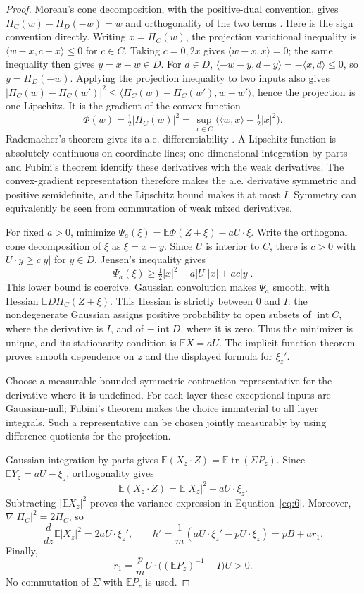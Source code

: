 \begin{proof}
Moreau's cone decomposition, with the positive-dual convention, gives
\(\Pi_C(w)-\Pi_D(-w)=w\) and orthogonality of the two terms
\cite{Moreau1962,Soltan2019}. Here is the sign convention directly.
Writing $x=\Pi_C(w)$, the projection variational inequality is
$\langle w-x,c-x\rangle\le0$ for $c\in C$. Taking $c=0,2x$ gives
$\langle w-x,x\rangle=0$; the same inequality then gives $y=x-w\in D$.
For $d\in D$, $\langle-w-y,d-y\rangle=-\langle x,d\rangle\le0$,
so $y=\Pi_D(-w)$. Applying the projection inequality to two inputs
also gives
$|\Pi_C(w)-\Pi_C(w')|^2\le\langle\Pi_C(w)-\Pi_C(w'),w-w'\rangle$,
hence the projection is one-Lipschitz. It is the gradient of the convex function
\[
\Phi(w)=\tfrac12|\Pi_C(w)|^2
=\sup_{x\in C}\bigl(\langle w,x\rangle-\tfrac12|x|^2\bigr).
\]
Rademacher's theorem gives its a.e. differentiability
\cite{Rademacher1919,NekvindaZajicek1988}. A Lipschitz function is
absolutely continuous on coordinate lines; one-dimensional integration
by parts and Fubini's theorem identify these derivatives with the weak
derivatives. The convex-gradient representation therefore makes the
a.e. derivative symmetric and positive semidefinite, and the Lipschitz
bound makes it at most \(I\). Symmetry can equivalently be seen from commutation of weak mixed derivatives.

For fixed \(a>0\), minimize
\(\Psi_a(\xi)=\mathbb E\Phi(Z+\xi)-aU\cdot\xi\).
Write the orthogonal cone decomposition of \(\xi\) as \(\xi=x-y\). Since \(U\) is interior to \(C\), there is \(c>0\) with \(U\cdot y\ge c|y|\) for \(y\in D\). Jensen's inequality gives
\[
\Psi_a(\xi)\ge\tfrac12|x|^2-a|U||x|+ac|y|.
\]
This lower bound is coercive. Gaussian convolution makes \(\Psi_a\) smooth, with Hessian \(\mathbb E D\Pi_C(Z+\xi)\). This Hessian is strictly between \(0\) and \(I\): the nondegenerate Gaussian assigns positive probability to open subsets of \(\operatorname{int}C\), where the derivative is \(I\), and of \(-\operatorname{int}D\), where it is zero. Thus the minimizer is unique, and its stationarity condition is \(\mathbb EX=aU\). The implicit function theorem proves smooth dependence on \(z\) and the displayed formula for \(\xi_z'\).

Choose a measurable bounded symmetric-contraction representative for the derivative where it is undefined. For each layer these exceptional inputs are Gaussian-null; Fubini's theorem makes the choice immaterial to all layer integrals. Such a representative can be chosen jointly measurably by using difference quotients for the projection.

Gaussian integration by parts gives \(\mathbb E(X_z\cdot Z)=\mathbb E\operatorname{tr}(\Sigma P_z)\). Since \(\mathbb EY_z=aU-\xi_z\), orthogonality gives
\[
\mathbb E(X_z\cdot Z)=\mathbb E|X_z|^2-aU\cdot\xi_z.
\]
Subtracting \(|\mathbb EX_z|^2\) proves the variance expression in Equation~\eqref{eq:6}. Moreover, \(\nabla|\Pi_C|^2=2\Pi_C\), so
\[
\frac d{dz}\mathbb E|X_z|^2=2aU\cdot\xi_z',\qquad
h'=\frac1m(aU\cdot\xi_z'-pU\cdot\xi_z)=pB+ar_1.
\]
Finally,
\[
r_1=\frac p m U\cdot\bigl((\mathbb EP_z)^{-1}-I\bigr)U>0.
\]
No commutation of \(\Sigma\) with \(\mathbb EP_z\) is used.
\end{proof}

